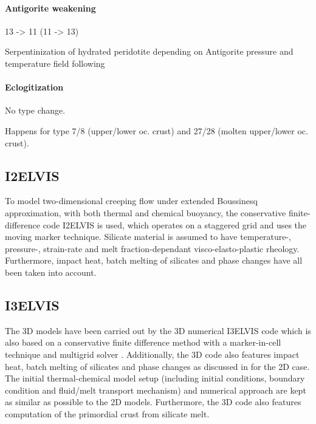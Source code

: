 \paragraph{Antigorite weakening}
13 -> 11 (11 -> 13)

Serpentinization of hydrated peridotite depending on Antigorite pressure and temperature field following \citep{Schmidt1998}

\paragraph{Eclogitization}
No type change.

Happens for type 7/8 (upper/lower oc. crust) and 27/28 (molten upper/lower oc. crust).

%


\subsection{I2ELVIS}

To model two-dimensional creeping flow under extended Boussinesq approximation, with both thermal and chemical buoyancy, the conservative finite-difference code I2ELVIS \citep{Gerya2003,Gerya2007} is used, which operates on a staggered grid and uses the moving marker technique. Silicate material is assumed to have temperature-, pressure-, strain-rate and melt fraction-dependant visco-elasto-plastic rheology. Furthermore, impact heat, batch melting of silicates and phase changes have all been taken into account.

\subsection{I3ELVIS}

The 3D models have been carried out by the 3D numerical I3ELVIS \citep{Gerya2007} code which is also based on a conservative finite difference method with a marker-in-cell technique and multigrid solver \citep{Gerya2003,Gerya2007}. Additionally, the 3D code also features impact heat, batch melting of silicates and phase changes as discussed in \citet{Golabek2011} for the 2D case. The initial thermal-chemical model setup (including initial conditions, boundary condition and fluid/melt transport mechanism) and numerical approach are kept as similar as possible to the 2D models. Furthermore, the 3D code also features computation of the primordial crust from silicate melt.

